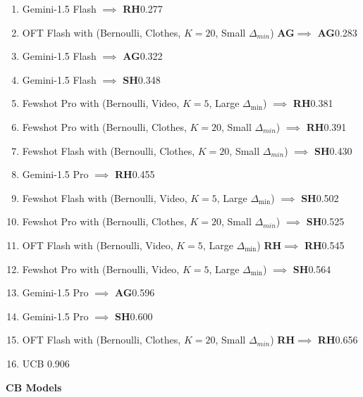 \documentclass[11pt, logo]{googledeepmind}
\newcommand{\SH}{\textbf{SH}\xspace}
\newcommand{\RH}{\textbf{RH}\xspace}
\newcommand{\AG}{\textbf{AG}\xspace}
\newcommand{\OFT}{OFT\xspace}
\theoremstyle{plain}
\theoremstyle{definition}
\begin{document}
\begin{enumerate}
    \item Gemini-1.5 Flash $\implies$ \RH \hfill 0.277
    \item \OFT Flash with  (Bernoulli, Clothes, $K=20$, Small $\Delta_{min}$) \AG $\implies$ \AG \hfill 0.283
    \item Gemini-1.5 Flash $\implies$ \AG \hfill 0.322
    \item Gemini-1.5 Flash $\implies$ \SH \hfill 0.348
    \item Fewshot Pro with (Bernoulli, Video, $K=5$, Large $\Delta_{\min}$) $\implies$ \RH \hfill 0.381
    \item Fewshot Pro with  (Bernoulli, Clothes, $K=20$, Small $\Delta_{min}$) $\implies$ \RH \hfill 0.391
    \item Fewshot Flash with  (Bernoulli, Clothes, $K=20$, Small $\Delta_{min}$) $\implies$ \SH \hfill 0.430
    \item Gemini-1.5 Pro $\implies$ \RH \hfill 0.455
    \item Fewshot Flash with (Bernoulli, Video, $K=5$, Large $\Delta_{\min}$) $\implies$ \SH \hfill 0.502
    \item Fewshot Pro with  (Bernoulli, Clothes, $K=20$, Small $\Delta_{min}$) $\implies$ \SH \hfill 0.525
    \item \OFT Flash with (Bernoulli, Video, $K=5$, Large $\Delta_{\min}$) \RH $\implies$ \RH \hfill 0.545
    \item Fewshot Pro with (Bernoulli, Video, $K=5$, Large $\Delta_{\min}$) $\implies$ \SH \hfill 0.564
    \item Gemini-1.5 Pro $\implies$ \AG \hfill 0.596
    \item Gemini-1.5 Pro $\implies$ \SH \hfill 0.600
    \item \OFT Flash with  (Bernoulli, Clothes, $K=20$, Small $\Delta_{min}$) \RH $\implies$ \RH \hfill 0.656
    \item UCB \hfill 0.906
\end{enumerate}
\textbf{CB Models}
\end{document}
